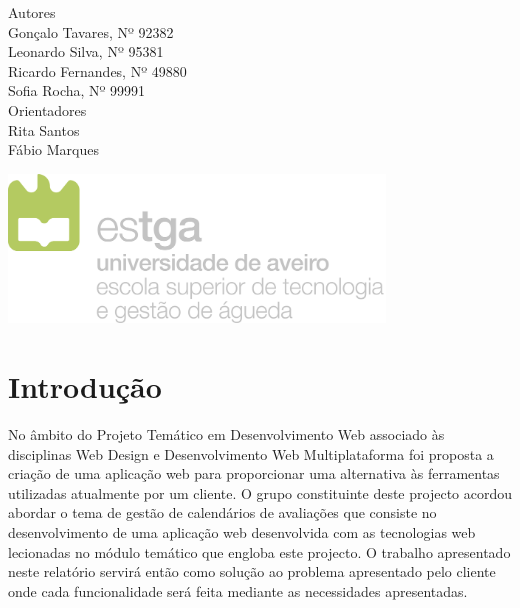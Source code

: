 \documentclass[11pt, twoside]{report}
\begin{document}
\begin{titlepage}
		
		
		\large
		Autores\\
		Gonçalo Tavares, Nº 92382  \\
		Leonardo Silva, Nº 95381 \\
		Ricardo Fernandes, Nº 49880  \\
		Sofia Rocha, Nº 99991 \\
		
		\vspace{1cm}
		Orientadores\\
		Rita Santos \\
		Fábio Marques\\
		\vspace{4cm}
		
		\centering
		\includegraphics[width=10cm]{image/AssB_vertical_cor}
		
	\end{titlepage}

	\newpage
	\setcounter{page}{1} %
	\tableofcontents %
	\thispagestyle{plain} %
	\thispagestyle{empty} %
	\newpage
	\listoftables %
	\newpage
	\listoffigures %
	
	\newpage
	\thispagestyle{plain}%
	\thispagestyle{empty}%
	
	
	\printnomenclature
	
	\newpage
	
	
	\chapter{Introdução}
	
	No âmbito do Projeto Temático em Desenvolvimento Web associado às disciplinas Web Design e Desenvolvimento Web Multiplataforma foi proposta a criação de uma aplicação web para proporcionar uma alternativa às ferramentas utilizadas atualmente por um cliente. 
	O grupo constituinte deste projecto acordou abordar o tema de gestão de calendários de avaliações que consiste no desenvolvimento de uma aplicação web desenvolvida com as tecnologias web lecionadas no módulo temático que engloba este projecto.
	O trabalho apresentado neste relatório servirá então como solução ao problema apresentado pelo cliente onde cada funcionalidade será feita mediante as necessidades apresentadas.
	
\end{document}
